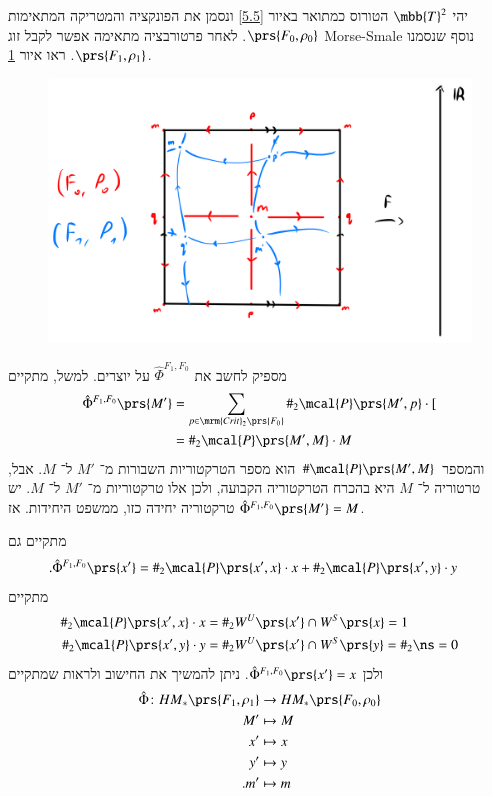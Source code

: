 \documentclass[a4paper,10pt,twoside,openany]{book}
\begin{document}
\begin{example}
יהי
$\mbb{T}^2$
הטורוס כמתואר באיור
\ref{5.5}
ונסמן את הפונקציה והמטריקה המתאימות
$\prs{F_0, \rho_0}$.
לאחר פרטורבציה מתאימה אפשר לקבל זוג
\textenglish{Morse-Smale}
נוסף שנסמנו
$\prs{F_1, \rho_1}$.
ראו איור
\ref{7.5}.

\begin{figure}
\centering
\includegraphics[scale=0.5]{sources/7.5}
\caption{}
\label{7.5}
\end{figure}

מספיק לחשב את
$\hat{\Phi}^{F_1, F_0}$
על יוצרים.
למשל, מתקיים
\begin{align*}
\hat{\Phi}^{F_1, F_0}\prs{M'} &= \sum_{p \in \mrm{Crit}_2\prs{F_0}} \#_2 \mcal{P}\prs{M', p} \cdot [
\\&= \#_2 \mcal{P}\prs{M', M} \cdot M
\end{align*}
והמספר
$\# \mcal{P}\prs{M',M}$
הוא מספר הטרקטוריות השבורות מ־%
$M'$
ל־%
$M$.
אבל, טרטוריה ל־%
$M$
היא בהכרח הטרקטוריה הקבועה, ולכן אלו טרקטוריות מ־%
$M'$
ל־%
$M$.
יש טרקטוריה יחידה כזו, ממשפט היחידות.
אז
$\hat{\Phi}^{F_1, F_0}\prs{M'} = M$.

מתקיים גם
\begin{align*}
\text{.} \hat{\Phi}^{F_1, F_0}\prs{x'} &= \#_2 \mcal{P}\prs{x', x} \cdot x + \#_2 \mcal{P}\prs{x', y} \cdot y
\end{align*}
מתקיים
\begin{align*}
\#_2 \mcal{P}\prs{x', x} \cdot x &= \#_2 W^U\prs{x'} \cap W^S\prs{x} = 1 \\
\#_2 \mcal{P}\prs{x', y} \cdot y &= \#_2 W^U\prs{x'} \cap W^S\prs{y} = \#_2 \ns = 0 
\end{align*}
ולכן
$\hat{\Phi}^{F_1, F_0} \prs{x'} = x$.
ניתן להמשיך את החישוב ולראות שמתקיים
\begin{align*}
\hat{\Phi} \colon {HM}_*\prs{F_1, \rho_1} &\to HM_*\prs{F_0, \rho_0} \\
M' &\mapsto M \\
x' &\mapsto x \\
y' &\mapsto y \\
\text{.} m' &\mapsto m
\end{align*}
\end{example}
\end{document}
